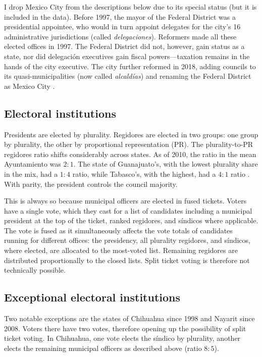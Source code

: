 \documentclass[letter,12pt]{article}
\begin{document}
I drop Mexico City from the descriptions below due to its special status (but it is included in the data). Before 1997, the mayor of the Federal District was a presidential appointee, who would in turn appoint delegates for the city's 16 administrative jurisdictions (called \emph{delegaciones}). Reformers made all these elected offices in 1997. The Federal District did not, however, gain status as a state, nor did delegación executives gain fiscal powers---taxation remains in the hands of the city executive. The city further reformed in 2018, adding councils to its quasi-municipalities (now called \emph{alcaldías}) and renaming the Federal District as Mexico City \citep{rabell.2017}. 

\subsection{Electoral institutions}
Presidents are elected by plurality. Regidores are elected in two groups: one group by plurality, the other by proportional representation (PR). The plurality-to-PR regidores ratio shifts considerably across states. As of 2010, the ratio in the mean Ayuntamiento was $2:1$. The state of Guanajuato's, with the lowest plurality share in the mix, had a $1:4$ ratio, while Tabasco's, with the highest, had a $4:1$ ratio \citep[][:14]{gil.2010}. With parity, the president controls the council majority.

This is always so because municipal officers are elected in fused tickets. Voters have a single vote, which they cast for a list of candidates including a municipal president at the top of the ticket, ranked regidores, and síndicos where applicable. The vote is fused \citep[see ][:42]{cox.1997} as it simultaneously affects the vote totals of candidates running for different offices: the presidency, all plurality regidores, and síndicos, where elected, are allocated to the most-voted list. Remaining regidores are distributed proportionally to the closed lists. Split ticket voting is therefore not technically possible.

\subsection{Exceptional electoral institutions}
Two notable exceptions are the states of Chihuahua since 1998 and Nayarit since 2008. Voters there have two votes, therefore opening up the possibility of split ticket voting. In Chihuahua, one vote elects the síndico by plurality, another elects the remaining municipal officers as described above (ratio $8:5$).
\end{document}

